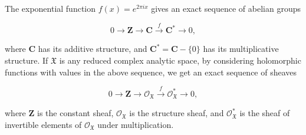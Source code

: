 The exponential function $f(x) = e^{2\pi i x}$ gives an exact sequence of abelian groups

$$0 \rightarrow \mathbf{Z} \rightarrow \mathbf{C} \xrightarrow{f} \mathbf{C}^* \rightarrow 0,$$

where $\mathbf{C}$ has its additive structure, and $\mathbf{C}^* = \mathbf{C} - \{0\}$ has its multiplicative structure. If $\mathfrak{X}$ is any reduced complex analytic space, by considering holomorphic functions with values in the above sequence, we get an exact sequence of sheaves

$$0 \rightarrow \mathbf{Z} \rightarrow \mathcal{O}_{\mathfrak{X}} \xrightarrow{f} \mathcal{O}_{\mathfrak{X}}^* \rightarrow 0,$$

where $\mathbf{Z}$ is the constant sheaf, $\mathcal{O}_{\mathfrak{X}}$ is the structure sheaf, and $\mathcal{O}_{\mathfrak{X}}^*$ is the sheaf of invertible elements of $\mathcal{O}_{\mathfrak{X}}$ under multiplication.